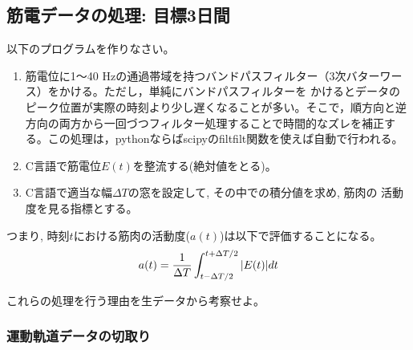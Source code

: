 \documentclass{jsarticle}
\begin{document}
\subsection{筋電データの処理: 目標3日間}
以下のプログラムを作りなさい。
\begin{enumerate}
\item 筋電位に1〜40 Hzの通過帯域を持つバンドパスフィルター（3次バターワース）をかける。ただし，単純にバンドパスフィルターを
かけるとデータのピーク位置が実際の時刻より少し遅くなることが多い。そこで，順方向と逆方向の両方から一回づつフィルター処理することで時間的なズレを補正する。この処理は，pythonならばscipyのfiltfilt関数を使えば自動で行われる。
\item C言語で筋電位$E(t)$を整流する(絶対値をとる)。
\item C言語で適当な幅$\Delta T$の窓を設定して, その中での積分値を求め, 筋肉の
  活動度を見る指標とする。
\end{enumerate}
つまり, 時刻$t$における筋肉の活動度($a(t)$)は以下で評価することになる。
\begin{align}
  a(t)=\frac{1}{\Delta T}\int_{t-\Delta T/2}^{t+\Delta T/2}|E(t)|dt\notag
\end{align}

これらの処理を行う理由を生データから考察せよ。

\subsubsection{運動軌道データの切取り}
\end{document}
